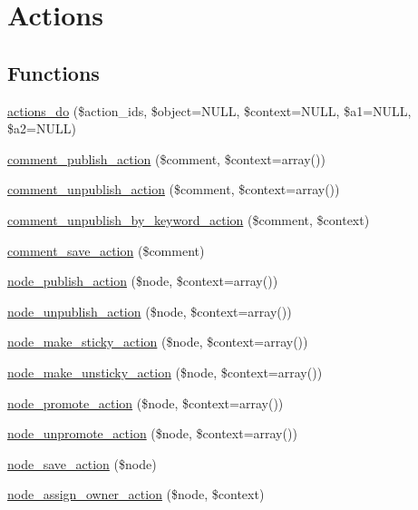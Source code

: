 \hypertarget{group__actions}{
\section{Actions}
\label{group__actions}
}
\subsection*{Functions}
\begin{DoxyCompactItemize}
\item 
\hyperlink{group__actions_gacfece93b3453da7c572057dde3453122}{actions\_\-do} (\$action\_\-ids, \$object=NULL, \$context=NULL, \$a1=NULL, \$a2=NULL)
\item 
\hyperlink{group__actions_gab4b880ee11ea9075bf10e6e29d21ba25}{comment\_\-publish\_\-action} (\$comment, \$context=array())
\item 
\hyperlink{group__actions_gaa4f6361d453bff4f865f19bc369ecdfe}{comment\_\-unpublish\_\-action} (\$comment, \$context=array())
\item 
\hyperlink{group__actions_gaf5c19c791a33e0dc2b0bd3eb4fa79ba5}{comment\_\-unpublish\_\-by\_\-keyword\_\-action} (\$comment, \$context)
\item 
\hyperlink{group__actions_ga074553675107cf7c8cac925d76666922}{comment\_\-save\_\-action} (\$comment)
\item 
\hyperlink{group__actions_gadf8322ab430e3fb9cbb7e84db47b744f}{node\_\-publish\_\-action} (\$node, \$context=array())
\item 
\hyperlink{group__actions_ga93d63f63526d64026ebdd5fc6572f5ab}{node\_\-unpublish\_\-action} (\$node, \$context=array())
\item 
\hyperlink{group__actions_ga73254d8abc7dfa53cd2259230bd5246a}{node\_\-make\_\-sticky\_\-action} (\$node, \$context=array())
\item 
\hyperlink{group__actions_gab04ec5d42febda8ef49715c27c4ad126}{node\_\-make\_\-unsticky\_\-action} (\$node, \$context=array())
\item 
\hyperlink{group__actions_ga5e48e8fd6348bdc8e826b84446ed2c0d}{node\_\-promote\_\-action} (\$node, \$context=array())
\item 
\hyperlink{group__actions_ga8f13fd18828b94e3736a39264149f927}{node\_\-unpromote\_\-action} (\$node, \$context=array())
\item 
\hyperlink{group__actions_ga84f5af7da5d6f9161307f61e8b345bce}{node\_\-save\_\-action} (\$node)
\item 
\hyperlink{group__actions_ga35a1ee4e6845f1031ef84ef787252efd}{node\_\-assign\_\-owner\_\-action} (\$node, \$context)

\end{DoxyCompactItemize}
